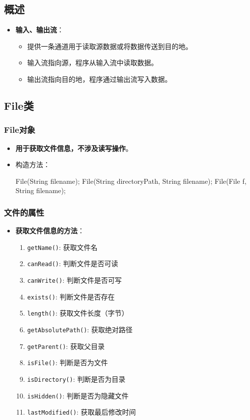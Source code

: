 \documentclass[a4paper, 10pt]{ctexart}
\begin{document}
\subsection{概述}
\begin{itemize}
  \item \textbf{输入、输出流}：
  \begin{itemize}
    \item 提供一条通道用于读取源数据或将数据传送到目的地。
    \item 输入流指向源，程序从输入流中读取数据。
    \item 输出流指向目的地，程序通过输出流写入数据。
  \end{itemize}
\end{itemize}

\subsection{File类}
\subsubsection{File对象}
\begin{itemize}
  \item \textbf{用于获取文件信息，不涉及读写操作}。
  \item 构造方法：
  \begin{codeblock}
File(String filename);
File(String directoryPath, String filename);
File(File f, String filename);
  \end{codeblock}
\end{itemize}

\subsubsection{文件的属性}
\begin{itemize}
  \item \textbf{获取文件信息的方法}：
  \begin{enumerate}
    \item \texttt{getName()}: 获取文件名
    \item \texttt{canRead()}: 判断文件是否可读
    \item \texttt{canWrite()}: 判断文件是否可写
    \item \texttt{exists()}: 判断文件是否存在
    \item \texttt{length()}: 获取文件长度（字节）
    \item \texttt{getAbsolutePath()}: 获取绝对路径
    \item \texttt{getParent()}: 获取父目录
    \item \texttt{isFile()}: 判断是否为文件
    \item \texttt{isDirectory()}: 判断是否为目录
    \item \texttt{isHidden()}: 判断是否为隐藏文件
    \item \texttt{lastModified()}: 获取最后修改时间
  \end{enumerate}
\end{itemize}
\end{document}
